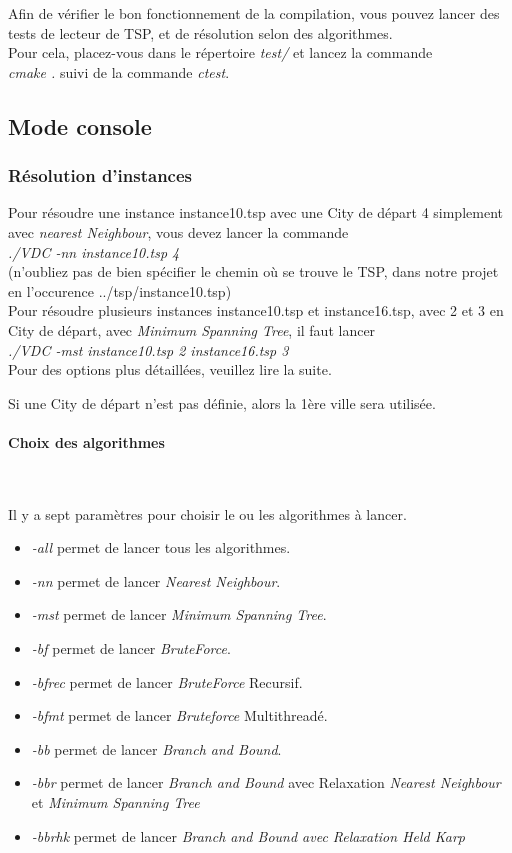 \documentclass[12pt]{report}
\begin{document}
Afin de vérifier le bon fonctionnement de la compilation, vous pouvez lancer des tests de lecteur de TSP, et de résolution selon des algorithmes.\\
Pour cela, placez-vous dans le répertoire \emph{test/} et lancez la commande \\ 
\emph{cmake .} suivi de la commande \emph{ctest}.


\subsection{Mode console}

\subsubsection{Résolution d'instances}

Pour résoudre une instance instance10.tsp avec une City de départ 4 simplement avec \textit{nearest Neighbour}, vous devez lancer la commande\\
\emph{./VDC -nn instance10.tsp 4} \\
(n'oubliez pas de bien spécifier le chemin où se trouve le TSP, dans notre projet en l'occurence ../tsp/instance10.tsp)\\

Pour résoudre plusieurs instances instance10.tsp et instance16.tsp, avec 2 et 3 en City de départ, avec \textit{Minimum Spanning Tree}, il faut lancer \\
\emph{./VDC -mst instance10.tsp 2 instance16.tsp 3}\\

Pour des options plus détaillées, veuillez lire la suite.


Si une City de départ n'est pas définie, alors la 1ère ville sera utilisée.

\paragraph{Choix des algorithmes} \

Il y a sept paramètres pour choisir le ou les algorithmes à lancer. 
\begin{itemize}
	\item \emph{-all} permet de lancer tous les algorithmes. 
	\item \emph{-nn} permet de lancer \textit{Nearest Neighbour}. 
	\item \emph{-mst} permet de lancer \textit{Minimum Spanning Tree}. 
	\item \emph{-bf} permet de lancer \textit{BruteForce}. 
	\item \emph{-bfrec} permet de lancer \textit{BruteForce} Recursif. 
	\item \emph{-bfmt} permet de lancer \textit{Bruteforce} Multithreadé. 
	\item \emph{-bb} permet de lancer \textit{Branch and Bound}. 
    \item \emph{-bbr} permet de lancer \textit{Branch and Bound} avec Relaxation \textit{Nearest Neighbour} et \textit{Minimum Spanning Tree}
    \item \emph{-bbrhk} permet de lancer \textit{Branch and Bound avec Relaxation Held Karp}
\end{itemize}
\end{document}

